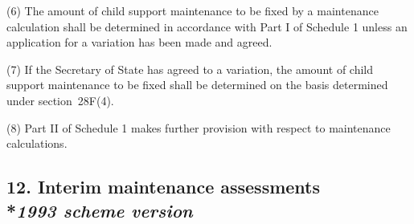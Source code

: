 \documentclass[12pt,a4paper]{article}
\begin{document}
(6) The amount of child support maintenance to be fixed by a maintenance calculation shall be determined in accordance with Part I of Schedule 1 unless an application for a variation has been made and agreed.

(7) If the 
Secretary of State  %
has agreed to a variation, the amount of child support maintenance to be fixed shall be determined on the basis 
determined  %
under section~28F(4).

(8) Part II of Schedule 1 makes further provision with respect to maintenance calculations.


\subsection[12. Interim maintenance assessments --- \emph{1993 scheme version}]{12. Interim maintenance assessments\\*\emph{1993 scheme version}}


%
%
%
%
%
\end{document}
